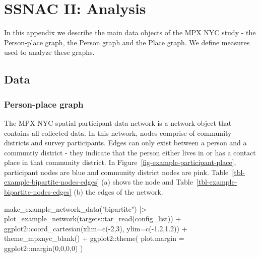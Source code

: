 \documentclass[
  letterpaper,
  DIV=11,
  numbers=noendperiod,
  oneside]{scrreprt}
\newenvironment{Shaded}{\begin{snugshade}}{\end{snugshade}}
\newcommand{\AttributeTok}[1]{\textcolor[rgb]{0.40,0.45,0.13}{#1}}
\newcommand{\DecValTok}[1]{\textcolor[rgb]{0.68,0.00,0.00}{#1}}
\newcommand{\FloatTok}[1]{\textcolor[rgb]{0.68,0.00,0.00}{#1}}
\newcommand{\FunctionTok}[1]{\textcolor[rgb]{0.28,0.35,0.67}{#1}}
\newcommand{\NormalTok}[1]{\textcolor[rgb]{0.00,0.23,0.31}{#1}}
\newcommand{\SpecialCharTok}[1]{\textcolor[rgb]{0.37,0.37,0.37}{#1}}
\newcommand{\StringTok}[1]{\textcolor[rgb]{0.13,0.47,0.30}{#1}}
\begin{document}
\hypertarget{sec-appendix-network-analysis}{%
\chapter{SSNAC II: Analysis}\label{sec-appendix-network-analysis}}

In this appendix we describe the main data objects of the MPX NYC study
- the Person-place graph, the Person graph and the Place graph. We
define measures used to analyze these graphs.

\hypertarget{data}{%
\section{Data}\label{data}}

\hypertarget{person-place-graph}{%
\subsection{Person-place graph}\label{person-place-graph}}

The MPX NYC spatial participant data network is a network object that
contains all collected data. In this network, nodes comprise of
community districts and survey participants. Edges can only exist
between a person and a communtiy district - they indicate that the
person either lives in or has a contact place in that community
district. In Figure~\ref{fig-example-participant-place}, participant
nodes are blue and community district nodes are pink.
Table~\ref{tbl-example-bipartite-nodes-edges} (a) shows the node and
Table~\ref{tbl-example-bipartite-nodes-edges} (b) the edges of the
network.

\begin{Shaded}
\begin{Highlighting}[]
\FunctionTok{make\_example\_network\_data}\NormalTok{(}\StringTok{"bipartite"}\NormalTok{) }\SpecialCharTok{|\textgreater{}}
  \FunctionTok{plot\_example\_network}\NormalTok{(targets}\SpecialCharTok{::}\FunctionTok{tar\_read}\NormalTok{(config\_list)) }\SpecialCharTok{+}
\NormalTok{  ggplot2}\SpecialCharTok{::}\FunctionTok{coord\_cartesian}\NormalTok{(}\AttributeTok{xlim=}\FunctionTok{c}\NormalTok{(}\SpecialCharTok{{-}}\DecValTok{2}\NormalTok{,}\DecValTok{3}\NormalTok{), }\AttributeTok{ylim=}\FunctionTok{c}\NormalTok{(}\SpecialCharTok{{-}}\FloatTok{1.2}\NormalTok{,}\FloatTok{1.2}\NormalTok{)) }\SpecialCharTok{+}
  \FunctionTok{theme\_mpxnyc\_blank}\NormalTok{() }\SpecialCharTok{+}
\NormalTok{  ggplot2}\SpecialCharTok{::}\FunctionTok{theme}\NormalTok{(}
    \AttributeTok{plot.margin =}\NormalTok{ ggplot2}\SpecialCharTok{::}\FunctionTok{margin}\NormalTok{(}\DecValTok{0}\NormalTok{,}\DecValTok{0}\NormalTok{,}\DecValTok{0}\NormalTok{,}\DecValTok{0}\NormalTok{)}
\NormalTok{  )}
\end{Highlighting}
\end{Shaded}
\end{document}

